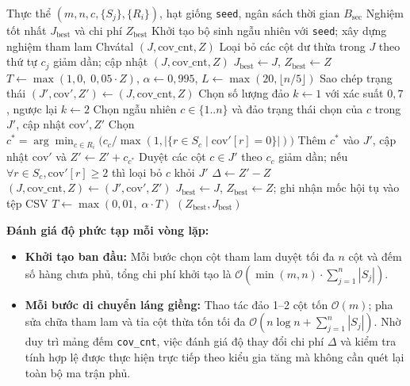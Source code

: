 \documentclass[11pt, a4paper]{article}
\begin{document}
\begin{algorithm}[htbp]
\caption{Thuật toán Simulated Annealing giải SCP (\texttt{SASolver})}
\label{alg:sa}
\begin{algorithmic}[1]
\Require Thực thể $(m, n, c, \{S_j\}, \{R_i\})$, hạt giống \texttt{seed}, ngân sách thời gian $B_{\text{sec}}$
\Ensure Nghiệm tốt nhất $J_{\text{best}}$ và chi phí $Z_{\text{best}}$
\State Khởi tạo bộ sinh ngẫu nhiên với \texttt{seed}; xây dựng nghiệm tham lam Chvátal $(J, \text{cov\_cnt}, Z)$
\State Loại bỏ các cột dư thừa trong $J$ theo thứ tự $c_j$ giảm dần; cập nhật $(J, \text{cov\_cnt}, Z)$
\State $J_{\text{best}} \leftarrow J$, $Z_{\text{best}} \leftarrow Z$
\State $T \leftarrow \max(1{,}0,\; 0{,}05 \cdot Z)$, $\alpha \leftarrow 0{,}995$, $L \leftarrow \max(20, \lfloor n / 5 \rfloor)$
        \State Sao chép trạng thái $(J', \text{cov}', Z') \leftarrow (J, \text{cov\_cnt}, Z)$
        \State Chọn số lượng đảo $k \leftarrow 1$ với xác suất $0{,}7$, ngược lại $k \leftarrow 2$
            \State Chọn ngẫu nhiên $c \in \{1..n\}$ và đảo trạng thái chọn của $c$ trong $J'$, cập nhật $\text{cov}', Z'$
        \EndFor
         
            \State Chọn $c^* = \arg\min_{c \in R_i} \big(c_c / \max(1, |\{r \in S_c \mid \text{cov}'[r] = 0\}|)\big)$
            \State Thêm $c^*$ vào $J'$, cập nhật $\text{cov}'$ và $Z' \leftarrow Z' + c_{c^*}$
        \EndFor
        \State Duyệt các cột $c \in J'$ theo $c_c$ giảm dần; nếu $\forall r \in S_c, \text{cov}'[r] \ge 2$ thì loại bỏ $c$ khỏi $J'$
        \State $\Delta \leftarrow Z' - Z$
            \State $(J, \text{cov\_cnt}, Z) \leftarrow (J', \text{cov}', Z')$
                \State $J_{\text{best}} \leftarrow J$, $Z_{\text{best}} \leftarrow Z$; ghi nhận mốc hội tụ vào tệp CSV
            \EndIf
        \EndIf
    \EndFor
    \State $T \leftarrow \max(0{,}01,\; \alpha \cdot T)$
\EndWhile
\State \Return $(Z_{\text{best}}, J_{\text{best}})$
\end{algorithmic}
\end{algorithm}

\textbf{Đánh giá độ phức tạp mỗi vòng lặp:}
\begin{itemize}
    \item \textbf{Khởi tạo ban đầu:} Mỗi bước chọn cột tham lam duyệt tối đa $n$ cột và đếm số hàng chưa phủ, tổng chi phí khởi tạo là $\mathcal{O}(\min(m, n) \cdot \sum_{j=1}^n |S_j|)$.
    \item \textbf{Mỗi bước di chuyển láng giềng:} Thao tác đảo 1--2 cột tốn $\mathcal{O}(m)$; pha sửa chữa tham lam và tỉa cột thừa tốn tối đa $\mathcal{O}(n \log n + \sum_{j=1}^n |S_j|)$. Nhờ duy trì mảng đếm \texttt{cov\_cnt}, việc đánh giá độ thay đổi chi phí $\Delta$ và kiểm tra tính hợp lệ được thực hiện trực tiếp theo kiểu gia tăng mà không cần quét lại toàn bộ ma trận phủ.
\end{itemize}
\end{document}
